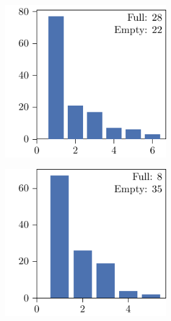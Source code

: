 \begin{figure}[p]
\begin{subfigure}{\textwidth}
\begin{subfigure}{\mymultiouter}
    \end{subfigure}
  \end{subfigure}
  \centering
  \begin{subfigure}{\textwidth}
    \centering
    \begin{subfigure}{\mymultiouter}
        \centering
          \includegraphics[width=\mymultiinner]{figures/new/relaxed_common-diabetes-qlibra-permutation}
    \end{subfigure}
    \begin{subfigure}{\mymultiouter}
        \centering
          \includegraphics[width=\mymultiinner]{figures/new/relaxed_common-diabetes-qlibra-retraining}
    \end{subfigure}
    \begin{subfigure}{\mymultiouter}
        \centering

\end{subfigure}
\end{subfigure}
\end{figure}
